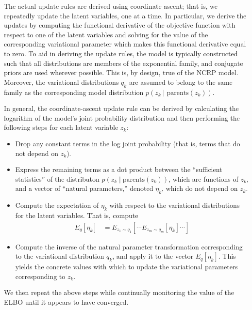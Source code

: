 \documentclass{article}
\begin{document}
The actual update rules are derived using coordinate ascent; that is, we repeatedly update the latent variables, one at a time.
In particular, we derive the updates by computing the functional derivative of the objective function with respect to one of the latent variables and solving for the value of the corresponding variational parameter which makes this functional derivative equal to zero.
To aid in deriving the update rules, the model is typically constructed such that all distributions are members of the exponential family, and conjugate priors are used wherever possible.
This is, by design, true of the NCRP model.
Moreover, the variational distributions $q_k$ are assumed to belong to the same family as the corresponding model distribution $p(z_k \mid \text{parents}(z_k))$.

In general, the coordinate-ascent update rule can be derived by calculating the logarithm of the model's joint probability distribution and then performing the following steps for each latent variable $z_k$:
\begin{itemize}
\item Drop any constant terms in the log joint probability (that is, terms that do not depend on $z_k$).
\item Express the remaining terms as a dot product between the ``sufficient statistics'' of the distributon $p(z_k \mid \text{parents}(z_k))$, which are functions of $z_k$, and a vector of ``natural parameters,'' denoted $\eta_k$, which do not depend on $z_k$.
\item Compute the expectation of $\eta_k$ with respect to the variational distributions for the latent variables.
That is, compute
\begin{align}
E_q[\eta_k] &= E_{z_1 \sim q_1} \left[ \cdots E_{z_m \sim q_m} \left[ \eta_k \right] \cdots \right]
\end{align}
\item Compute the inverse of the natural parameter transformation corresponding to the variational distribution $q_k$, and apply it to the vector $E_q[\eta_k]$.
This yields the concrete values with which to update the variational parameters corresponding to $z_k$.
\end{itemize}
We then repeat the above steps while continually monitoring the value of the ELBO until it appears to have converged.
\end{document}

